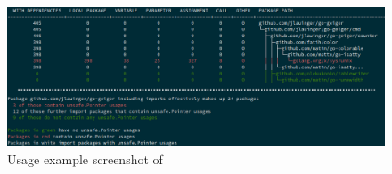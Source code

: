 \begin{figure}[htp!]
    \centering
    \includegraphics[width=\textwidth]{assets/images/chapter4/go-geiger-screenshot.png}
    \caption{Usage example screenshot of \toolGeiger{}}
    \label{fig:go-geiger-screenshot}
\end{figure}
